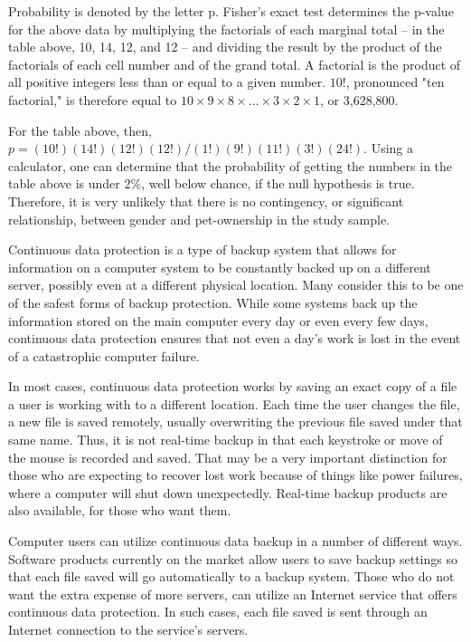 Probability is denoted by the letter p. Fisher's exact test determines the p-value for the above data by multiplying the factorials of each marginal total -- in the table above, 10, 14, 12, and 12 -- and dividing the result by the product of the factorials of each cell number and of the grand total. A factorial is the product of all positive integers less than or equal to a given number. $10!$, pronounced "ten factorial," is therefore equal to $10\times 9\times8 \times \ldots\times 3 \times 2 \times 1$, or 3,628,800.

For the table above, then, $p= (10!)(14!)(12!)(12!)/(1!)(9!)(11!)(3!)(24!)$. Using a calculator, one can determine that the probability of getting the numbers in the table above is under $2\%$, well below chance, if the null hypothesis is true. Therefore, it is very unlikely that there is no contingency, or significant relationship, between gender and pet-ownership in the study sample.


Continuous data protection is a type of backup system that allows for information on a computer system to be constantly backed up on a different server, possibly even at a different physical location. Many consider this to be one of the safest forms of backup protection. While some systems back up the information stored on the main computer every day or even every few days, continuous data protection ensures that not even a day's work is lost in the event of a catastrophic computer failure.

In most cases, continuous data protection works by saving an exact copy of a file a user is working with to a different location. Each time the user changes the file, a new file is saved remotely, usually overwriting the previous file saved under that same name. Thus, it is not real-time backup in that each keystroke or move of the mouse is recorded and saved. That may be a very important distinction for those who are expecting to recover lost work because of things like power failures, where a computer will shut down unexpectedly. Real-time backup products are also available, for those who want them.

Computer users can utilize continuous data backup in a number of different ways. Software products currently on the market allow users to save backup settings so that each file saved will go automatically to a backup system. Those who do not want the extra expense of more servers, can utilize an Internet service that offers continuous data protection. In such cases, each file saved is sent through an Internet connection to the service's servers.

